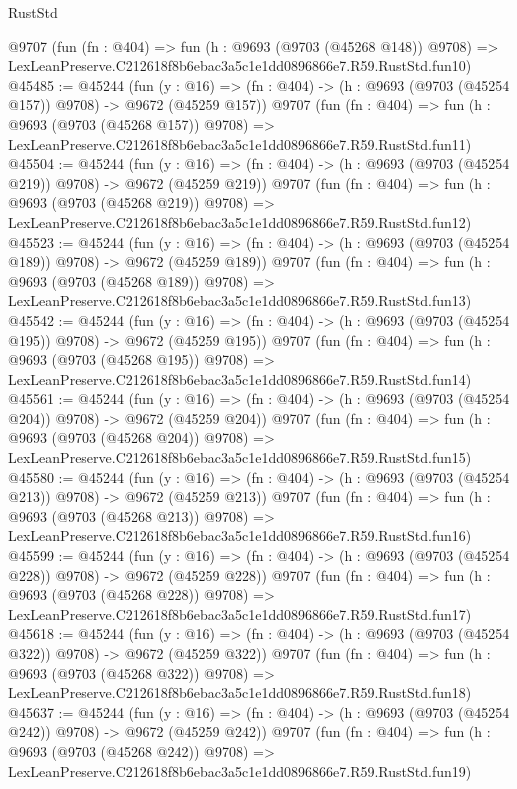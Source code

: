 \begin{lexlean}{RustStd}
\begin{coremodule}
    @9707
    (fun (fn : @404) =>
    fun (h : @9693 (@9703 (@45268 @148)) @9708) =>
    LexLeanPreserve.C212618f8b6ebac3a5c1e1dd0896866e7.R59.RustStd.fun10)
@45485 := @45244
    (fun (y : @16) => (fn : @404) -> (h : @9693 (@9703 (@45254 @157)) @9708) -> @9672 (@45259 @157))
    @9707
    (fun (fn : @404) =>
    fun (h : @9693 (@9703 (@45268 @157)) @9708) =>
    LexLeanPreserve.C212618f8b6ebac3a5c1e1dd0896866e7.R59.RustStd.fun11)
@45504 := @45244
    (fun (y : @16) => (fn : @404) -> (h : @9693 (@9703 (@45254 @219)) @9708) -> @9672 (@45259 @219))
    @9707
    (fun (fn : @404) =>
    fun (h : @9693 (@9703 (@45268 @219)) @9708) =>
    LexLeanPreserve.C212618f8b6ebac3a5c1e1dd0896866e7.R59.RustStd.fun12)
@45523 := @45244
    (fun (y : @16) => (fn : @404) -> (h : @9693 (@9703 (@45254 @189)) @9708) -> @9672 (@45259 @189))
    @9707
    (fun (fn : @404) =>
    fun (h : @9693 (@9703 (@45268 @189)) @9708) =>
    LexLeanPreserve.C212618f8b6ebac3a5c1e1dd0896866e7.R59.RustStd.fun13)
@45542 := @45244
    (fun (y : @16) => (fn : @404) -> (h : @9693 (@9703 (@45254 @195)) @9708) -> @9672 (@45259 @195))
    @9707
    (fun (fn : @404) =>
    fun (h : @9693 (@9703 (@45268 @195)) @9708) =>
    LexLeanPreserve.C212618f8b6ebac3a5c1e1dd0896866e7.R59.RustStd.fun14)
@45561 := @45244
    (fun (y : @16) => (fn : @404) -> (h : @9693 (@9703 (@45254 @204)) @9708) -> @9672 (@45259 @204))
    @9707
    (fun (fn : @404) =>
    fun (h : @9693 (@9703 (@45268 @204)) @9708) =>
    LexLeanPreserve.C212618f8b6ebac3a5c1e1dd0896866e7.R59.RustStd.fun15)
@45580 := @45244
    (fun (y : @16) => (fn : @404) -> (h : @9693 (@9703 (@45254 @213)) @9708) -> @9672 (@45259 @213))
    @9707
    (fun (fn : @404) =>
    fun (h : @9693 (@9703 (@45268 @213)) @9708) =>
    LexLeanPreserve.C212618f8b6ebac3a5c1e1dd0896866e7.R59.RustStd.fun16)
@45599 := @45244
    (fun (y : @16) => (fn : @404) -> (h : @9693 (@9703 (@45254 @228)) @9708) -> @9672 (@45259 @228))
    @9707
    (fun (fn : @404) =>
    fun (h : @9693 (@9703 (@45268 @228)) @9708) =>
    LexLeanPreserve.C212618f8b6ebac3a5c1e1dd0896866e7.R59.RustStd.fun17)
@45618 := @45244
    (fun (y : @16) => (fn : @404) -> (h : @9693 (@9703 (@45254 @322)) @9708) -> @9672 (@45259 @322))
    @9707
    (fun (fn : @404) =>
    fun (h : @9693 (@9703 (@45268 @322)) @9708) =>
    LexLeanPreserve.C212618f8b6ebac3a5c1e1dd0896866e7.R59.RustStd.fun18)
@45637 := @45244
    (fun (y : @16) => (fn : @404) -> (h : @9693 (@9703 (@45254 @242)) @9708) -> @9672 (@45259 @242))
    @9707
    (fun (fn : @404) =>
    fun (h : @9693 (@9703 (@45268 @242)) @9708) =>
    LexLeanPreserve.C212618f8b6ebac3a5c1e1dd0896866e7.R59.RustStd.fun19)

\end{coremodule}
\end{lexlean}

